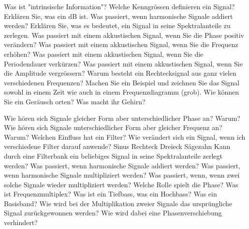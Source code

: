 \documentclass[ngerman,a4paper,12pt]{scrreprt}
\begin{document}
\olR
	\li Was ist "intrinsische Information"?
	\li Welche Kenngrössen definieren ein Signal?
	\li Erklären Sie, was ein dB ist. 
	\li Was passiert, wenn harmonische Signale addiert werden?
	\li Erklären Sie, was es bedeutet, ein Signal in seine Spektralanteile zu zerlegen.
	\li Was passiert mit einem akkustischen Signal, wenn Sie die Phase positiv verändern?
	\li Was passiert mit einem akkustischen Signal, wenn Sie die Frequenz erhöhen?
	\li Was passiert mit einem akkustischen Signal, wenn Sie die Periodendauer verkürzen?
	\li Was passiert mit einem akkustischen Signal, wenn Sie die Amplitude vergrössern?
	\li Warum besteht ein Rechtecksignal aus ganz vielen verschiedenen Frequenzen? Machen Sie ein Beispiel und zeichnen Sie das Signal sowohl in einem Zeit wie auch in einem Frequenzdiagramm (grob).
	\li Wie können Sie ein Geräusch orten? Was macht ihr Gehirn?
\olS

\olR
	\li Wie hören sich Signale gleicher Form aber unterschiedlicher Phase an? Warum?
	\li Wie hören sich Signale unterschiedlicher Form aber gleicher Frequenz an? Warum?
	\li Welchen Einfluss hat ein Filter?
	\li Wie verändert sich ein Signal, wenn ich verschiedene Filter darauf anwende?
		\ul
			\li Sinus
			\li Rechteck
			\li Dreieck
			\li Sägezahn
		\ulE
	\li Kann durch eine Filterbank ein beliebiges Signal in seine Spektralanteile zerlegt werden?
	\li Was passiert, wenn harmonische Signale addiert werden?
	\li Was passiert, wenn harmonische Signale multipliziert werden? Was passiert, wenn, wenn zwei solche Signale wieder multipliziert werden? Welche Rolle spielt die Phase?
	\li Was ist Frequenzmultiplex?
	\li Was ist ein Tiefbass, was ein Hochbass? Was ein Basisband?
	\li Wie wird bei der Multiplikation zweier Signale das ursprüngliche Signal zurückgewonnen werden? Wie wird dabei eine Phasenverschiebung verhindert?
\olS
\end{document}
